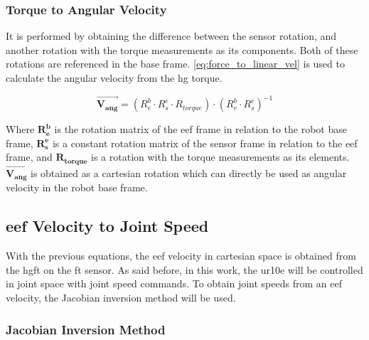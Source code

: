 \subsubsection{Torque to Angular Velocity}


\par It is performed by obtaining the difference between the sensor rotation, and another rotation with the torque measurements as its components. Both of these rotations are referenced in the base frame. \autoref{eq:force_to_linear_vel} is used to calculate the angular velocity from the \ac{hg} torque.

\begin{equation}
    \vec{\mathbf{V_{ang}}} = (R^b_e \cdot R^e_s \cdot R_{torque}) \cdot (R^b_e \cdot R^e_s)^{-1}
    \label{eq:torque_to_angular_vel}
\end{equation}

\noindent Where $\mathbf{R^b_e}$ is the rotation matrix of the \ac{eef} frame in relation to the robot base frame, $\mathbf{R^e_s}$ is a constant rotation matrix of the sensor frame in relation to the \ac{eef} frame, and $\mathbf{R_{torque}}$ is a rotation with the torque measurements as its elements. $\vec{\mathbf{V_{ang}}}$ is obtained as a cartesian rotation which can directly be used as angular velocity in the robot base frame.



\subsection{\ac{eef} Velocity to Joint Speed}
\label{ssec:eef_to_js}

\par With the previous equations, the \ac{eef} velocity in cartesian space is obtained from the \ac{hgft} on the \ac{ft} sensor. As said before, in this work, the \ac{ur10e} will be controlled in joint space with joint speed commands. To obtain joint speeds from an \ac{eef} velocity, the Jacobian inversion method will be used.


\subsubsection{Jacobian Inversion Method}


